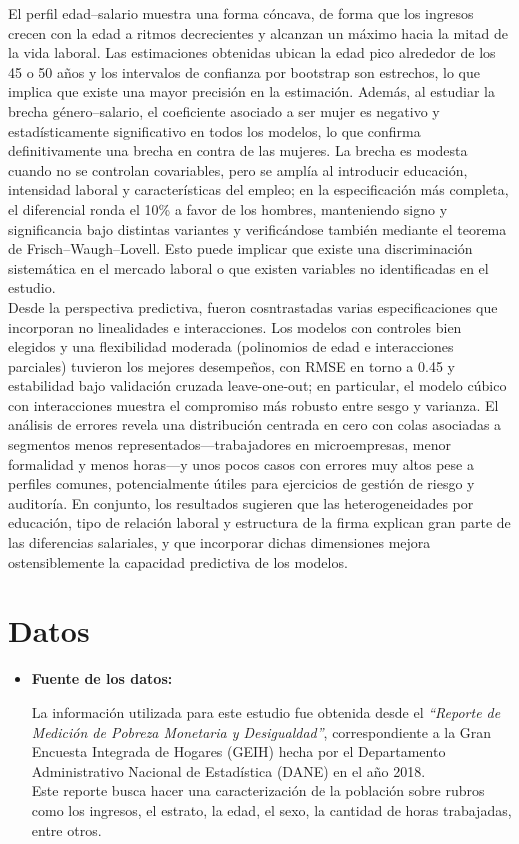 \documentclass[12pt,a4paper,onecolumn]{article}
\begin{document}
El perfil edad–salario muestra una forma cóncava, de forma que los ingresos crecen con la edad a ritmos decrecientes y alcanzan un máximo hacia la mitad de la vida laboral. Las estimaciones obtenidas ubican la edad pico alrededor de los 45 o 50 años y los intervalos de confianza por bootstrap son estrechos, lo que implica que existe una mayor precisión en la estimación. Además, al estudiar la brecha género–salario, el coeficiente asociado a ser mujer es negativo y estadísticamente significativo en todos los modelos, lo que confirma definitivamente una brecha en contra de las mujeres. La brecha es modesta cuando no se controlan covariables, pero se amplía al introducir educación, intensidad laboral y características del empleo; en la especificación más completa, el diferencial ronda el 10\% a favor de los hombres, manteniendo signo y significancia bajo distintas variantes y verificándose también mediante el teorema de Frisch–Waugh–Lovell. Esto puede implicar que existe una discriminación sistemática en el mercado laboral o que existen variables no identificadas en el estudio.\\

Desde la perspectiva predictiva, fueron cosntrastadas varias especificaciones que incorporan no linealidades e interacciones. Los modelos con controles bien elegidos y una flexibilidad moderada (polinomios de edad e interacciones parciales) tuvieron los mejores desempeños, con RMSE en torno a 0.45 y estabilidad bajo validación cruzada leave-one-out; en particular, el modelo cúbico con interacciones muestra el compromiso más robusto entre sesgo y varianza. El análisis de errores revela una distribución centrada en cero con colas asociadas a segmentos menos representados—trabajadores en microempresas, menor formalidad y menos horas—y unos pocos casos con errores muy altos pese a perfiles comunes, potencialmente útiles para ejercicios de gestión de riesgo y auditoría. En conjunto, los resultados sugieren que las heterogeneidades por educación, tipo de relación laboral y estructura de la firma explican gran parte de las diferencias salariales, y que incorporar dichas dimensiones mejora ostensiblemente la capacidad predictiva de los modelos. 


\section{Datos} \label{sec:intro}

\begin{itemize}
\item \textbf{Fuente de los datos:}

La información utilizada para este estudio fue obtenida desde el \textit{“Reporte de Medición de Pobreza Monetaria y Desigualdad”}, correspondiente a la Gran Encuesta Integrada de Hogares (GEIH) hecha por el Departamento Administrativo Nacional de Estadística (DANE) en el año 2018.\\

Este reporte busca hacer una caracterización de la población sobre rubros como los ingresos, el estrato, la edad, el sexo, la cantidad de horas trabajadas, entre otros.\\ 

\end{itemize}
\end{document}

